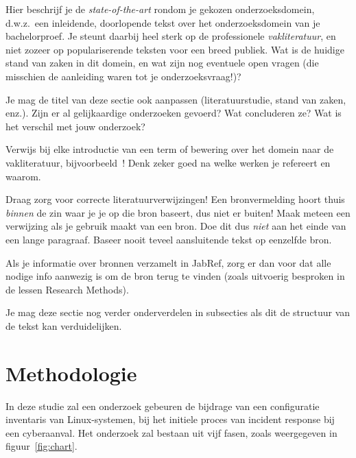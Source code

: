Hier beschrijf je de \emph{state-of-the-art} rondom je gekozen onderzoeksdomein, d.w.z.\ een inleidende, doorlopende tekst over het onderzoeksdomein van je bachelorproef. Je steunt daarbij heel sterk op de professionele \emph{vakliteratuur}, en niet zozeer op populariserende teksten voor een breed publiek. Wat is de huidige stand van zaken in dit domein, en wat zijn nog eventuele open vragen (die misschien de aanleiding waren tot je onderzoeksvraag!)?

Je mag de titel van deze sectie ook aanpassen (literatuurstudie, stand van zaken, enz.). Zijn er al gelijkaardige onderzoeken gevoerd? Wat concluderen ze? Wat is het verschil met jouw onderzoek?

Verwijs bij elke introductie van een term of bewering over het domein naar de vakliteratuur, bijvoorbeeld~\autocite{Hykes2013}! Denk zeker goed na welke werken je refereert en waarom.

Draag zorg voor correcte literatuurverwijzingen! Een bronvermelding hoort thuis \emph{binnen} de zin waar je je op die bron baseert, dus niet er buiten! Maak meteen een verwijzing als je gebruik maakt van een bron. Doe dit dus \emph{niet} aan het einde van een lange paragraaf. Baseer nooit teveel aansluitende tekst op eenzelfde bron.

Als je informatie over bronnen verzamelt in JabRef, zorg er dan voor dat alle nodige info aanwezig is om de bron terug te vinden (zoals uitvoerig besproken in de lessen Research Methods).


Je mag deze sectie nog verder onderverdelen in subsecties als dit de structuur van de tekst kan verduidelijken.

\section{Methodologie}%
\label{sec:methodologie}

In deze studie zal een onderzoek gebeuren de bijdrage van een configuratie inventaris van Linux-systemen, bij het initiele proces van incident response bij een cyberaanval. Het onderzoek zal bestaan uit vijf fasen, zoals weergegeven in figuur~\ref{fig:chart}.

